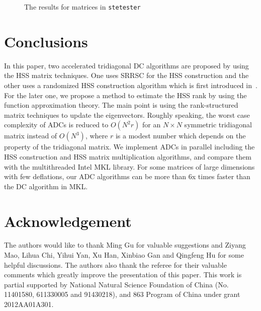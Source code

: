 \documentclass[times]{nlaauth}
\newcounter{algorithm}
\begin{document}
\begin{figure}[ptbh]
\centering
{}
\caption{The results for matrices in \texttt{stetester}}
\label{fig:lapack-tester}
\end{figure}

\section{Conclusions}

In this paper, two accelerated tridiagonal DC algorithms are proposed by
using the HSS matrix techniques. One uses SRRSC for the HSS construction and the other
uses a randomized HSS construction algorithm which is first introduced in~\cite{rand-hss}.
For the later one, we propose a method to estimate the HSS rank
by using the function approximation theory.
The main point is using the rank-structured matrix techniques to update the eigenvectors.
Roughly speaking,  the worst case complexity of ADCs is reduced to $O(N^2r)$ for an $N\times N$
symmetric tridiagonal matrix instead of $O(N^3)$, where $r$ is a modest number which depends on
the property of the tridiagonal matrix.
We implement ADCs in parallel including the HSS construction and HSS matrix multiplication algorithms, and
compare them with the multithreaded Intel MKL library.
For some matrices of large dimensions with few deflations, our ADC algorithms can be more than 6x times faster than the DC algorithm in MKL.


\section*{Acknowledgement}

The authors would like to thank Ming Gu for valuable suggestions and Ziyang Mao,
Lihua Chi, Yihui Yan, Xu Han, Xinbiao Gan
and Qingfeng Hu for some helpful discussions.
The authors also thank the referee for their valuable comments which greatly improve the presentation of this paper.
This work is partial supported by National Natural Science Foundation of China (No. 11401580, 611330005 and 91430218),
and 863 Program of China under grant 2012AA01A301.
\end{document}
